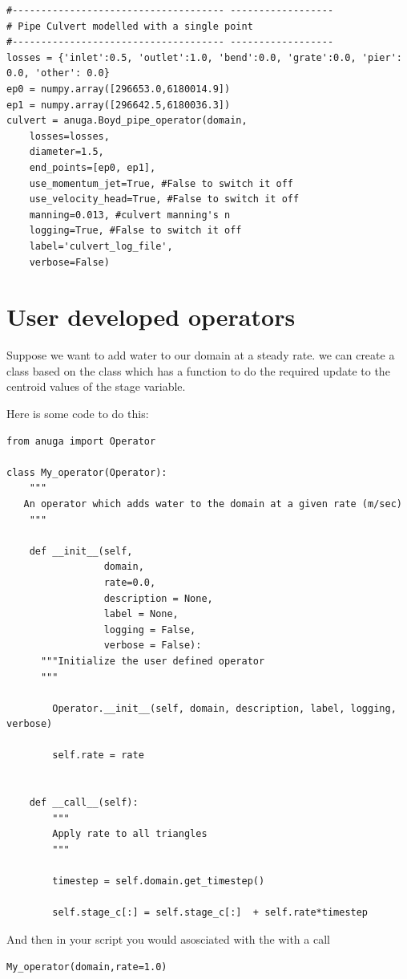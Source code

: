 \documentclass{manual}
\begin{document}
\begin{verbatim}
#------------------------------------- ------------------
# Pipe Culvert modelled with a single point 
#------------------------------------- ------------------
losses = {'inlet':0.5, 'outlet':1.0, 'bend':0.0, 'grate':0.0, 'pier': 0.0, 'other': 0.0} 
ep0 = numpy.array([296653.0,6180014.9]) 
ep1 = numpy.array([296642.5,6180036.3])      
culvert = anuga.Boyd_pipe_operator(domain, 
    losses=losses, 
    diameter=1.5, 
    end_points=[ep0, ep1], 
    use_momentum_jet=True, #False to switch it off
    use_velocity_head=True, #False to switch it off
    manning=0.013, #culvert manning's n
    logging=True, #False to switch it off
    label='culvert_log_file', 
    verbose=False) 
\end{verbatim}

\section{User developed operators}

Suppose we want to add water to our domain at a steady rate. we can create a class based on the  class which has a  function to do the required update to the centroid values of the stage variable.

Here is some code to do this:
\begin{verbatim}
from anuga import Operator

class My_operator(Operator):
    """
   An operator which adds water to the domain at a given rate (m/sec)
    """

    def __init__(self,
                 domain,
                 rate=0.0,
                 description = None,
                 label = None,
                 logging = False,
                 verbose = False):
	  """Initialize the user defined operator
	  """

        Operator.__init__(self, domain, description, label, logging, verbose)
       
        self.rate = rate


    def __call__(self):
        """
        Apply rate to all triangles 
        """

        timestep = self.domain.get_timestep()

        self.stage_c[:] = self.stage_c[:]  + self.rate*timestep
\end{verbatim}

And then in your script you would asosciated  with the  with a call 
\begin{verbatim}
My_operator(domain,rate=1.0)
\end{verbatim}
\end{document}
